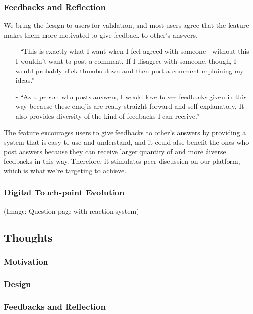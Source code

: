 \documentclass[a4paper]{article}
\begin{document}
    \subsubsection*{Feedbacks and Reflection}
    We bring the design to users for validation, and most users agree that the feature makes them more motivated to give feedback to other's answers.
    \begin{itemize}
        \item[-] ``This is exactly what I want when I feel agreed with someone - without this I wouldn't want to post a comment.
                   If I disagree with someone, though, I would probably click thumbs down and then post a comment explaining my ideas.''
        \item[-] ``As a person who posts answers, I would love to see feedbacks given in this way because these emojis are really straight forward and self-explanatory.
                   It also provides diversity of the kind of feedbacks I can receive.''
    \end{itemize}
    The feature encourages users to give feedbacks to other's answers by providing a system that is easy to use and understand,
    and it could also benefit the ones who post answers because they can receive larger quantity of and more diverse feedbacks in this way.
    Therefore, it stimulates peer discussion on our platform, which is what we're targeting to achieve.

    \subsubsection*{Digital Touch-point Evolution}
    (Image: Question page with reaction system)

    \subsection*{Thoughts}

    \iffalse
    \subsubsection*{Motivation}
    \subsubsection*{Design}
    \subsubsection*{Feedbacks and Reflection}
\end{document}
